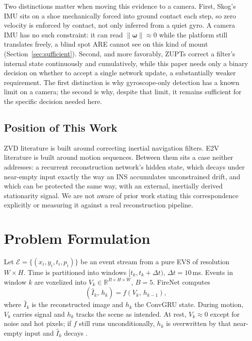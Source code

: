 \documentclass[journal]{IEEEtran}
\DeclareRobustCommand{\norm}[1]{\lVert #1 \rVert}
\begin{document}
Two distinctions matter when moving this evidence to a camera. First, Skog's IMU
sits on a shoe mechanically forced into ground contact each step, so zero
velocity is enforced by contact, not only inferred from a quiet gyro. A camera
IMU has no such constraint: it can read \(\norm{\boldsymbol{\omega}} \approx 0\) while
the platform still translates freely, a blind spot ARE cannot see on this kind
of mount (Section~\ref{sec:sufficient}). Second, and more favorably, ZUPTs
correct a filter's internal state continuously and cumulatively, while this
paper needs only a binary decision on whether to accept a single network update,
a substantially weaker requirement. The first distinction is why gyroscope-only
detection has a known limit on a camera; the second is why, despite that limit,
it remains sufficient for the specific decision needed here.

\subsection{Position of This Work}
ZVD literature is built around correcting inertial navigation filters. E2V
literature is built around motion sequences. Between them sits a case neither
addresses: a recurrent reconstruction network's hidden state, which decays under
near-empty input exactly the way an INS accumulates unconstrained drift, and
which can be protected the same way, with an external, inertially derived
stationarity signal. We are not aware of prior work stating this correspondence
explicitly or measuring it against a real reconstruction pipeline.

\section{Problem Formulation}
\label{sec:problem}
Let \(\mathcal{E} = \{(x_i, y_i, t_i, p_i)\}\) be an event stream from a pure
EVS of resolution \(W \times H\). Time is partitioned into windows
\([t_k, t_k+\Delta t)\), \(\Delta t = 10\)\,ms. Events in window \(k\) are
voxelized into \(V_k \in \mathbb{R}^{B \times H \times W}\), \(B = 5\). FireNet
computes
\begin{equation}
(\hat{I}_k,\, h_k) = f(V_k,\, h_{k-1}),
\end{equation}
where \(\hat{I}_k\) is the reconstructed image and \(h_k\) the ConvGRU state.
During motion, \(V_k\) carries signal and \(h_k\) tracks the scene as intended.
At rest, \(V_k \approx 0\) except for noise and hot pixels; if \(f\) still runs
unconditionally, \(h_k\) is overwritten by that near-empty input and
\(\hat{I}_k\) decays \cite{scheerlinck2020}.
\end{document}
